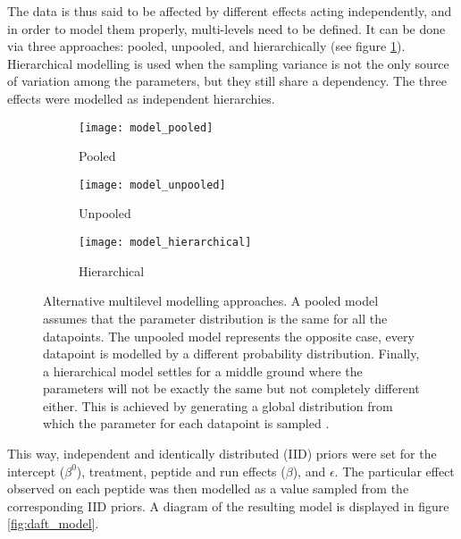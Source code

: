 The data is thus said to be affected by different effects acting independently, and in order to model them properly, multi-levels need to be defined. It can be done via three approaches: pooled, unpooled, and hierarchically (see figure \ref{fig:multilevel}). Hierarchical modelling is used when the sampling variance is not the only source of variation among the parameters, but they still share a dependency. The three effects were modelled as independent hierarchies.

\begin{figure}[!h]
\centering
\begin{subfigure}{.9\textwidth}
\centering
\caption*{Pooled}
\texttt{[image: model\_pooled]}
\end{subfigure}
\bigskip
\begin{subfigure}{.9\textwidth}
\centering
\caption*{Unpooled}
\texttt{[image: model\_unpooled]}
\end{subfigure}
\bigskip
\begin{subfigure}{.9\textwidth}
\centering
\caption*{Hierarchical}
\texttt{[image: model\_hierarchical]}
\end{subfigure}
\caption[]{Alternative multilevel modelling approaches. A pooled model assumes that the parameter distribution is the same for all the datapoints.  The unpooled model represents the opposite case, every datapoint is modelled by a different probability distribution. Finally, a hierarchical model settles for a middle ground where the parameters will not be exactly the same but not completely different either. This is achieved by generating a global distribution from which the parameter for each datapoint is sampled \footnotemark{}.}
\label{fig:multilevel}
\end{figure}



This way, independent and identically distributed (\ac{IID}) priors were set for the intercept ($\beta^0$), treatment, peptide and run effects ($\beta$), and $\epsilon$. The particular effect observed on each peptide was then modelled as a value sampled from the corresponding \ac{IID} priors. A diagram of the resulting model is displayed in figure \ref{fig:daft_model}.


